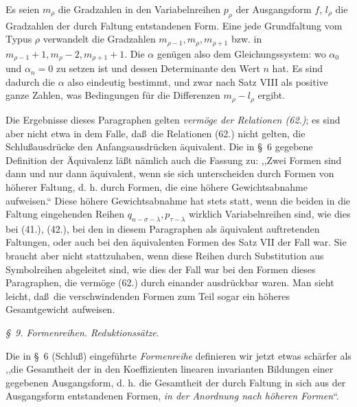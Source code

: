 Es seien $m_\rho$ die Gradzahlen in den Variabelnreihen $p_\rho$ der Ausgangsform $f$, $l_\rho$ die Gradzahlen der durch Faltung entstandenen Form. Eine jede Grundfaltung vom Typus $\rho$ verwandelt die Gradzahlen $m_{\rho-1},m_\rho,m_{\rho+1}$ bzw. in $m_{\rho-1}+1,m_\rho-2,m_{\rho+1}+1$. Die $\alpha$ gen\"ugen also dem Gleichungssystem:
wo $\alpha_0$ und $\alpha_n=0$ zu setzen ist und dessen Determinante den Wert $n$ hat. Es sind dadurch die $\alpha$ also eindeutig bestimmt, und zwar nach Satz VIII als positive ganze Zahlen, was Bedingungen f\"ur die Differenzen $m_\rho-l_\rho$ ergibt.

Die Ergebnisse dieses Paragraphen gelten \emph{verm\"oge der Relationen (62.)}; es sind aber nicht etwa in dem Falle, da\ss\ die Relationen (62.) nicht gelten, die Schlu\ss{}ausdr\"ucke den Anfangsausdr\"ucken \"aquivalent. Die in \S\ 6 gegebene Definition der \"Aquivalenz l\"a\ss t n\"amlich auch die Fassung zu: ,,Zwei Formen sind dann und nur dann \"aquivalent, wenn sie sich unterscheiden durch Formen von h\"oherer Faltung, d. h. durch Formen, die eine h\"ohere Gewichtsabnahme aufweisen.`` Diese h\"ohere Gewichtsabnahme hat stets statt, wenn die beiden in die Faltung eingehenden Reihen $q_{n-\sigma-\lambda},p_{\tau-\lambda}$ wirklich Variabelnreihen sind, wie dies bei (41.), (42.), bei den in diesem Paragraphen als \"aquivalent auftretenden Faltungen, oder auch bei den \"aquivalenten Formen des Satz VII der Fall war. Sie braucht aber nicht stattzuhaben, wenn diese Reihen durch Substitution aus Symbolreihen abgeleitet sind, wie dies der Fall war bei den Formen dieses Paragraphen, die verm\"oge (62.) durch einander ausdr\"uckbar waren. Man sieht leicht, da\ss\ die verschwindenden Formen zum Teil sogar ein h\"oheres Gesamtgewicht aufweisen.

\begin{center}
\emph{\S\ 9. Formenreihen. Reduktionss\"atze}.
\end{center}
Die in \S\ 6 (Schlu\ss) eingef\"uhrte \emph{Formenreihe} definieren wir jetzt etwas sch\"arfer als ,,die Gesamtheit der in den Koeffizienten linearen invarianten Bildungen einer gegebenen Ausgangsform, d. h. die Gesamtheit der durch Faltung in sich aus der Ausgangsform entstandenen Formen, \emph{in der Anordnung nach h\"oheren Formen}``.

